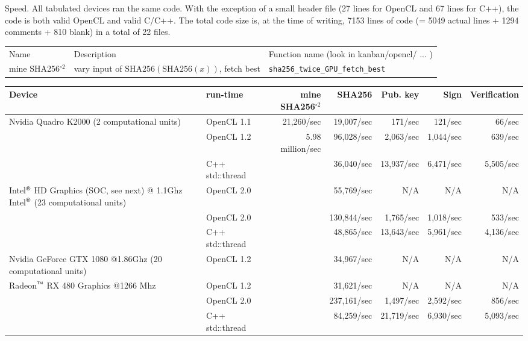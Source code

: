 \documentclass{article}
\begin{document}
Speed. All tabulated devices ran the same code. With the exception of a small header file (27 lines for OpenCL and 67 lines for C++), the code is both valid OpenCL and valid C/C++. The total code size is, at the time of writing, 7153 lines of code (= 5049 actual lines + 1294 comments + 810 blank) in a total of 22 files.


\begin{tabular}{lll}
Name & Description & Function name (look in kanban/opencl/ ... )\\
mine SHA256$^{\circ2}$& vary input of  $\text{SHA256}(\text{SHA256}(x))$, fetch best& \verb|sha256_twice_GPU_fetch_best|\\
\end{tabular}

\noindent\begin{tabular}{|p{5.5cm}|l|r|r||r|r|r|}\hline
Device & run-time &mine SHA256$^{\circ2}$& SHA256 & Pub. key & Sign & Verification\\\hline
Nvidia Quadro K2000 (2 computational units) & OpenCL 1.1 &21,260/sec &19,007/sec & 171/sec & 121/sec & 66/sec\\\hline
{} & OpenCL 1.2 &5.98 million/sec &96,028/sec & 2,063/sec& 1,044/sec & 639/sec\\
& C++ std::thread& & 36,040/sec&13,937/sec&6,471/sec&5,505/sec \\\hline\hline
Intel${}^{\text{\sffamily\textregistered}}$ HD Graphics (SOC, see next) @ 1.1Ghz Intel${}^{\text{\sffamily\textregistered}}$ (23 computational units) & OpenCL 2.0& & 55,769/sec& N/A & N/A& N/A \\\hline
{} & OpenCL 2.0 & &130,844/sec& 1,765/sec &1,018/sec& 533/sec\\
&C++ std::thread&  &48,865/sec& 13,643/sec&5,961/sec&4,136/sec \\\hline\hline
Nvidia GeForce GTX 1080 @1.86Ghz (20 computational units)&OpenCL 1.2& &34,967/sec&N/A&N/A&N/A\\\hline

Radeon${}^{\text{\sffamily\texttrademark}}$ RX 480 Graphics @1266 Mhz &OpenCL 1.2&  &31,621/sec& N/A & N/A& N/A
\\\hline

&OpenCL 2.0&  &237,161/sec & 1,497/sec & 2,592/sec&  856/sec\\
&C++ std::thread &&84,259/sec&21,719/sec&6,930/sec&5,093/sec\\\hline
\end{tabular}
\end{document}

